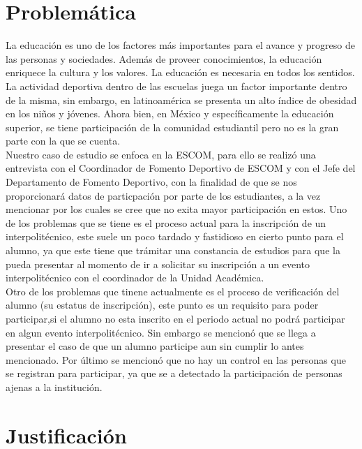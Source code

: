 \section{Problem\'atica}
\noindent La educación es uno de los factores más importantes para el avance y progreso de las personas y sociedades. Además de proveer conocimientos, la educación enriquece la cultura y los valores. La educación es necesaria en todos los sentidos.\\
La actividad deportiva dentro de las escuelas juega un factor importante dentro de la misma, sin embargo, en latinoamérica se presenta un alto índice de obesidad en los niños y jóvenes.  \cite{problemas}  Ahora bien, en México y específicamente la educación superior, se tiene participación de la comunidad estudiantil pero no es la gran parte con la que se cuenta.\\
Nuestro caso de estudio se enfoca en la ESCOM, para ello se realizó una entrevista con el Coordinador de Fomento Deportivo de ESCOM y con el Jefe del Departamento de Fomento Deportivo, con la finalidad de que se nos proporcionará datos de particpación por parte de los estudiantes, a la vez mencionar por los cuales se cree que no exita mayor participación en estos. Uno de los problemas que se tiene es el proceso actual para la inscripción de un interpolitécnico, este suele un poco tardado y fastidioso en cierto punto para el alumno, ya que este tiene que trámitar una constancia de estudios para que la pueda presentar al momento de ir a solicitar su inscripción a un evento interpolitécnico con el coordinador de la Unidad Académica.\\
Otro de los problemas que tinene actualmente es el proceso de verificación del alumno (su estatus de inscripción), este punto es un requisito para poder participar,si el alumno no esta inscrito en el periodo actual no podrá participar en algun evento interpolitécnico. Sin embargo se mencionó que se llega a presentar el caso de que un alumno participe aun sin cumplir lo antes mencionado.
Por último se mencionó que no hay un control en las personas que se registran para participar, ya que se a detectado la participación de personas ajenas a la institución. 


\section{Justificaci\'on}

